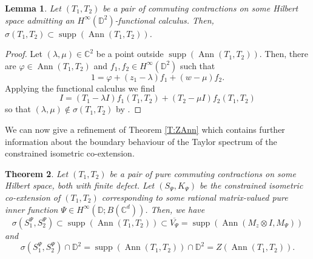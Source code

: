 \documentclass[10pt]{amsart}
\newcommand{\bC}{{\mathbb{C}}}
\newcommand{\bD}{{\mathbb{D}}}
\renewcommand{\phi}{\varphi}
\newcommand{\ol}{\overline}
\newcommand{\supp}{\operatorname{supp}}
\newcommand{\Ann}{\operatorname{Ann}}
\newtheorem{lemma}{Lemma}[section]
\newtheorem{theorem}[lemma]{Theorem}
\theoremstyle{definition}
\begin{document}
\begin{lemma}\label{L:suppTaylor}
Let $(T_1,T_2)$ be a pair of commuting contractions on some Hilbert space admitting an $H^\infty(\bD^2)$-functional calculus. Then, $\sigma(T_1,T_2)\subset \supp(\Ann(T_1,T_2))$.
\end{lemma}
\begin{proof}
Let $(\lambda,\mu)\in \bC^2$ be a point outside $\supp(\Ann(T_1,T_2))$. Then, there are $\phi\in \Ann(T_1,T_2)$ and $f_1,f_2\in H^\infty(\bD^2)$ such that 
\[
1=\phi+(z_1-\lambda)f_1+(w-\mu)f_2.
\]
Applying the functional calculus we find
\[
I=(T_1-\lambda I)f_1(T_1,T_2)+(T_2-\mu I)f_2(T_1,T_2)
\]
so that $(\lambda,\mu)\notin \sigma(T_1,T_2)$ by \cite[Proposition 25.3]{muller2007}.
\end{proof}
	 
	 We can now give a refinement of Theorem \ref{T:ZAnn} which  contains further information about the boundary behaviour of the Taylor spectrum of the constrained isometric co-extension.

	 \begin{theorem}\label{T:supp}
Let $(T_1,T_2)$ be a pair of pure commuting contractions on some Hilbert space, both with finite defect.  Let $(S_\Psi,K_\Psi)$ be the constrained isometric co-extension of $(T_1,T_2)$ corresponding to some rational matrix-valued pure inner function $\Psi\in H^\infty(\bD;B(\bC^d))$. Then, we have 
\[
\sigma(S^\Psi_1,S^\Psi_2)\subset \supp(\Ann(T_1,T_2))\subset \ol{V_\Psi}=\supp(\Ann(M_z\otimes I,M_\Psi))
\]
and
\[
\sigma(S^\Psi_1,S^\Psi_2)\cap \bD^2=\supp(\Ann(T_1,T_2))\cap \bD^2=Z(\Ann(T_1,T_2)).
\]
	 
	 \end{theorem}
	 
\end{document}
